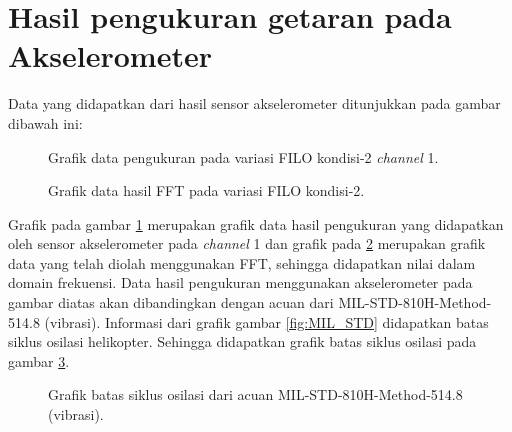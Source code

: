 \section{Hasil pengukuran getaran pada Akselerometer}

Data yang didapatkan dari hasil sensor akselerometer ditunjukkan pada gambar dibawah ini:

\begin{figure}[h]
	\centering
	\caption{Grafik data pengukuran pada variasi FILO kondisi-2 \textit{channel} 1.}
	\label{fig:raw_config2_FILO}
\end{figure}

\begin{figure}[H]
	\centering
	\caption{Grafik data hasil FFT pada variasi FILO kondisi-2.}
	\label{fig:fft_config2_FILO}
\end{figure}

Grafik pada gambar \ref{fig:raw_config2_FILO} merupakan grafik data hasil pengukuran yang didapatkan oleh sensor akselerometer pada \textit{channel} 1 dan grafik pada \ref{fig:fft_config2_FILO} merupakan grafik data yang telah diolah menggunakan FFT, sehingga didapatkan nilai dalam domain frekuensi. Data hasil pengukuran menggunakan akselerometer pada gambar diatas akan dibandingkan dengan acuan dari MIL-STD-810H-Method-514.8 (vibrasi). Informasi dari grafik gambar \ref{fig:MIL_STD} didapatkan batas siklus osilasi helikopter. Sehingga didapatkan grafik batas siklus osilasi pada gambar \ref{fig:batas_siklus}.

\begin{figure}[h]
	\centering
	\caption{Grafik batas siklus osilasi dari acuan MIL-STD-810H-Method-514.8 (vibrasi).}
	\label{fig:batas_siklus}
\end{figure}


